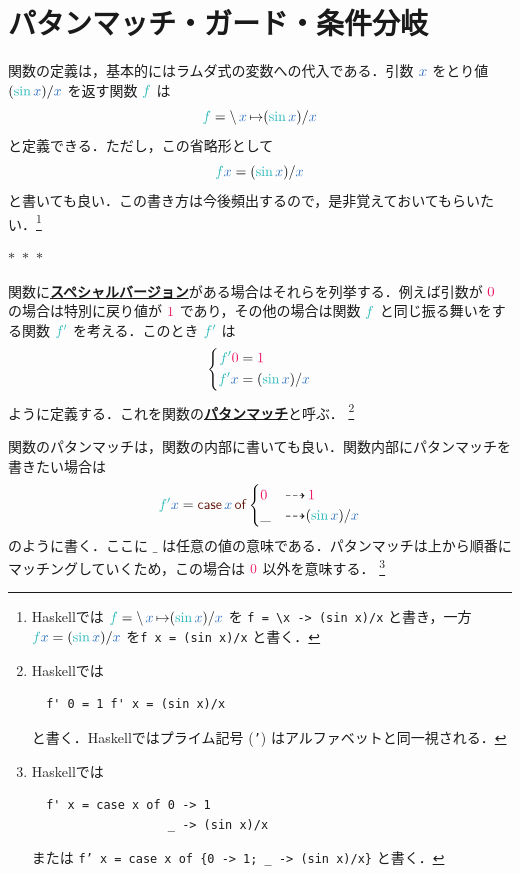 \documentclass[a5paper,twoside,fleqn,draft]{jsbook}
\def\constantColor{WildStrawberry}
\def\keywordColor{Sepia}
\def\varColor{NavyBlue}
\def\funcColor{BlueGreen}
\newcommand{\separator}{\begin{center}$*$~$*$~$*$\end{center}}
\newcommand{\programminglanguage}[1]{\textsf{#1}}
\newcommand{\haskell}{\programminglanguage{Haskell}}
\newcommand{\keyword}[1]{{\underline{\textbf{#1}}}}
\newcommand{\code}[1]{\texttt{#1}}
\newcommand{\mKeyword}[1]{\textcolor{\keywordColor}{\mathsf{#1}}}
\newcommand{\mCaseKeyword}{\mKeyword{case}}
\newcommand{\mOfKeyword}{\mKeyword{of}}
\DeclareMathOperator{\mCaseKW}{\mCaseKeyword}
\DeclareMathOperator{\mOfKW}{\mOfKeyword}
\newcommand{\mConstant}[1]{\textcolor{\constantColor}{#1}}
\newcommand{\mZeroNumber}{{\mConstant{0}}}
\newcommand{\mOneNumber}{{\mConstant{1}}}
\newcommand{\mVar}[1]{\textcolor{\varColor}{#1}}
\newcommand{\mXVar}{\mVar{x}}
\newcommand{\mFunc}[1]{\textcolor{\funcColor}{#1}}
\newcommand{\mSpecialFunc}[1]{\textcolor{\funcColor}{\textrm{#1}}}
\newcommand{\mFFunc}{{\mFunc{f}}}
\newcommand{\mFFFunc}{\mFunc{f'}}
\DeclareMathOperator{\mSin}{\mSpecialFunc{sin}}
\DeclareMathOperator{\mIfSo}{\dashrightarrow}
\DeclareMathOperator{\mLambda}{\backslash}
\DeclareMathOperator{\mLambdaArrow}{\mapsto}
\newcommand{\mCaseOf}[1]{\mCaseKW#1\mOfKW}
\begin{document}
\section{パタンマッチ・ガード・条件分岐}

関数の定義は，基本的にはラムダ式の変数への代入である．引数 $\mXVar$ をとり値 $(\mSin\mXVar)/\mXVar$ を返す関数 $\mFFunc$ は
\begin{equation}
  \mFFunc
  =\mLambda\mXVar\mLambdaArrow(\mSin\mXVar)/\mXVar
\end{equation}
と定義できる．ただし，この省略形として
\begin{equation}
  \mFFunc\mXVar
  =(\mSin\mXVar)/\mXVar
\end{equation}
と書いても良い．この書き方は今後頻出するので，是非覚えておいてもらいたい．\footnote{\haskell では $\mFFunc=\mLambda\mXVar\mLambdaArrow(\mSin\mXVar)/\mXVar$ を \code{f = \textbackslash x -> (sin x)/x} と書き，一方 $\mFFunc\mXVar=(\mSin\mXVar)/\mXVar$ を\code{f x = (sin x)/x} と書く．}

\separator

関数に\keyword{スペシャルバージョン}がある場合はそれらを列挙する．例えば引数が $\mZeroNumber$ の場合は特別に戻り値が $\mOneNumber$ であり，その他の場合は関数 $\mFFunc$ と同じ振る舞いをする関数 $\mFFFunc$ を考える．このとき $\mFFFunc$ は
\begin{equation}
  \left\{
  \begin{aligned}
    \mFFFunc\mZeroNumber&=\mOneNumber\\
    \mFFFunc\mXVar&=(\mSin\mXVar)/\mXVar
  \end{aligned}
  \right.
\end{equation}
ように定義する．これを関数の\keyword{パタンマッチ}と呼ぶ．
\footnote{\haskell では
\begin{verbatim}
  f' 0 = 1 f' x = (sin x)/x
\end{verbatim}
と書く．\haskell ではプライム記号 (\code{'}) はアルファベットと同一視される．}

関数のパタンマッチは，関数の内部に書いても良い．関数内部にパタンマッチを書きたい場合は
\begin{equation}
  \mFFFunc\mXVar=\mCaseOf{\mXVar}
  \begin{cases}
    \mZeroNumber&\mIfSo\mOneNumber\\
    \_&\mIfSo(\mSin\mXVar)/\mXVar
  \end{cases}
\end{equation}
のように書く．ここに $\_$ は任意の値の意味である．パタンマッチは上から順番にマッチングしていくため，この場合は $\mZeroNumber$ 以外を意味する．
\footnote{\haskell では
\begin{verbatim}
  f' x = case x of 0 -> 1
                   _ -> (sin x)/x
\end{verbatim}
または \code{f' x = case x of \{0 -> 1; \_ -> (sin x)/x\}} と書く．}
\end{document}
